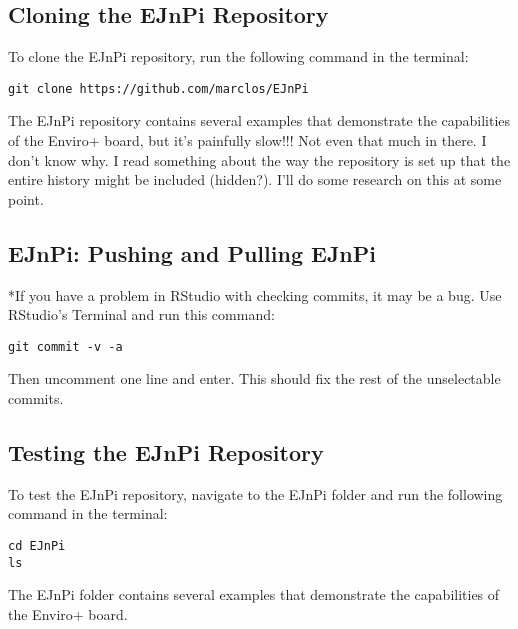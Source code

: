 \documentclass{article}
\begin{document}
\subsection{Cloning the EJnPi Repository}

To clone the EJnPi repository, run the following command in the terminal:

\begin{verbatim}
git clone https://github.com/marclos/EJnPi
\end{verbatim}

The EJnPi repository contains several examples that demonstrate the capabilities of the Enviro+ board, but it's painfully slow!!! Not even that much in there. I don't know why. I read something about the way the repository is set up that the entire history might be included (hidden?). I'll do some research on this at some point. 

\subsection{EJnPi: Pushing and Pulling EJnPi}


*If you have a problem in RStudio with checking commits, it may be a bug. Use RStudio's Terminal and run this command:

\begin{verbatim}
git commit -v -a
\end{verbatim}

Then uncomment one line and enter. This should fix the rest of the unselectable commits.


\subsection{Testing the EJnPi Repository}

To test the EJnPi repository, navigate to the EJnPi folder and run the following command in the terminal:

\begin{verbatim}
cd EJnPi
ls
\end{verbatim}

The EJnPi folder contains several examples that demonstrate the capabilities of the Enviro+ board.
\end{document}
